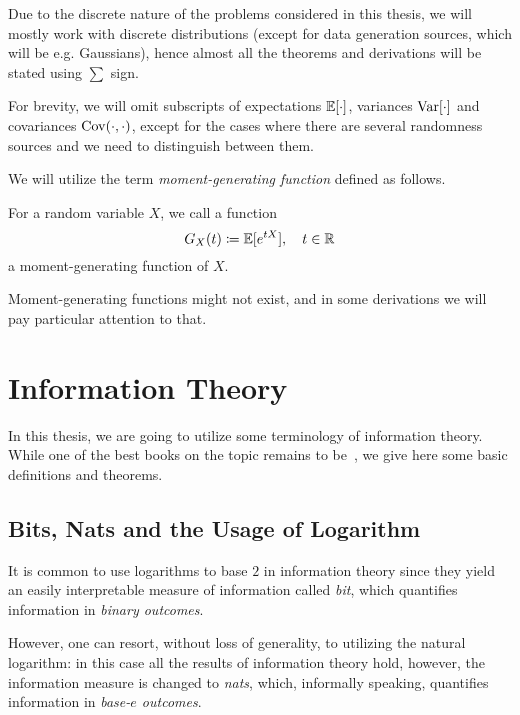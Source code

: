 Due to the discrete nature of the problems considered in this thesis, we will
mostly work with discrete distributions (except for data generation sources,
which will be e.g. Gaussians), hence almost all the theorems and derivations
will be stated using $\sum$ sign.

For brevity, we will omit subscripts of expectations $\mathbb{E}[\cdot]$, variances
${\mathrm{Var}}[\cdot]$ and covariances ${\mathrm{Cov}}(\cdot, \cdot)$, except for the cases where
there are several randomness sources and we need to distinguish between them.

We will utilize the term \textit{moment-generating function}
 defined as follows.
\begin{definition}
  For a random variable $X$, we call a function
  \begin{equation}
    G_X(t) \coloneqq \mathbb{E}[e^{tX}], \quad t \in \mathbb{R}
  \end{equation}
  a moment-generating function of $X$.
\end{definition}
Moment-generating functions might not exist, and in some derivations we will pay
particular attention to that.

\section{Information Theory}

In this thesis, we are going to utilize some terminology of information theory.
While one of the best books on the topic remains to be~\citep{Cover:2006}, we
give here some basic definitions and theorems.

\subsection{Bits, Nats and the Usage of Logarithm}
It is common to use logarithms to base $2$ in information theory since they
yield an easily interpretable measure of information called \textit{bit}, which
quantifies information in \textit{binary outcomes}. 

However, one can resort, without loss of generality, to utilizing the natural
logarithm: in this case all the results of information theory hold, however, the
information measure is changed to \textit{nats}, which, informally speaking,
quantifies information in \textit{base-$e$ outcomes}.

